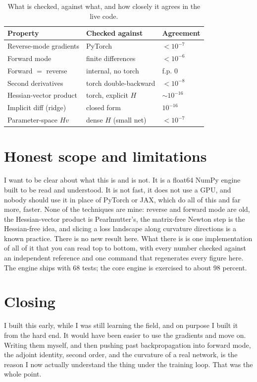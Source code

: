 \documentclass[conference]{IEEEtran}
\begin{document}
\begin{table}[t]
\centering
\caption{What is checked, against what, and how closely it agrees in the live code.}
\label{tab:verify}
\begin{tabular}{lll}
\toprule
Property & Checked against & Agreement \\
\midrule
Reverse-mode gradients & PyTorch & $< 10^{-7}$ \\
Forward mode & finite differences & $< 10^{-6}$ \\
Forward $=$ reverse & internal, no torch & f.p. $0$ \\
Second derivatives & torch double-backward & $< 10^{-8}$ \\
Hessian-vector product & torch, explicit $H$ & $\sim 10^{-16}$ \\
Implicit diff (ridge) & closed form & $10^{-16}$ \\
Parameter-space $Hv$ & dense $H$ (small net) & $< 10^{-7}$ \\
\bottomrule
\end{tabular}
\end{table}

\section{Honest scope and limitations}

I want to be clear about what this is and is not. It is a float64 NumPy engine built to be
read and understood. It is not fast, it does not use a GPU, and nobody should use it in
place of PyTorch or JAX, which do all of this and far more, faster. None of the techniques
are mine: reverse and forward mode are old, the Hessian-vector product is Pearlmutter's, the
matrix-free Newton step is the Hessian-free idea, and slicing a loss landscape along
curvature directions is a known practice. There is no new result here. What there is is one
implementation of all of it that you can read top to bottom, with every number checked
against an independent reference and one command that regenerates every figure here. The
engine ships with 68 tests; the core engine is exercised to about 98 percent.

\section{Closing}

I built this early, while I was still learning the field, and on purpose I built it from the
hard end. It would have been easier to use the gradients and move on. Writing them myself,
and then pushing past backpropagation into forward mode, the adjoint identity, second order,
and the curvature of a real network, is the reason I now actually understand the thing under
the training loop. That was the whole point.
\end{document}
